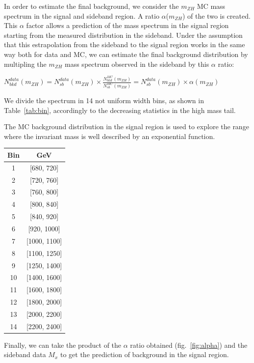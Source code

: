 \documentclass[12pt]{article} %
\begin{document}
In order to estimate the final background, we consider the $m_{ZH}$ MC mass spectrum in the signal and sideband region. A ratio $\alpha$($m_{ZH}$) of the two is created. This $\alpha$ factor allows a prediction of the mass spectrum in the signal region starting from the measured distribution in the sideband. Under the assumption that this estrapolation from the sideband to the signal region works in the same way both for data and MC, we can estimate the final background distribution by multipling the $m_{ZH}$ mass spectrum observed in the sideband by this $\alpha$ ratio:

$N_{bkd}^{data}(m_{ZH}) = N_{sb}^{data}(m_{ZH})\times \frac{N^{MC}_{bkd}(m_{ZH})}{N^{MC}_{sb}(m_{ZH})}= N_{sb}^{data}(m_{ZH})\times \alpha (m_{ZH})$


We divide the spectrum in 14 not uniform width bins, as shown in Table~\ref{tab:bin}, accordingly to the decreasing statistics in the high mass tail.

The MC background distribution in the signal region is used to explore the range where the invariant mass is well described by an exponential function.

\begin{center}
  \begin{tabular}{ c | c }
    \hline
    \bf Bin & \bf GeV \\
    \hline
    \hline
    1 & [680, 720] \\
    2 & [720, 760] \\
    3 & [760, 800] \\
    4 & [800, 840] \\
    5 & [840, 920] \\
    6 & [920, 1000] \\
    7 & [1000, 1100] \\
    8 & [1100, 1250] \\
    9 & [1250, 1400] \\
    10 & [1400, 1600] \\
    11 & [1600, 1800] \\
    12 & [1800, 2000] \\
    13 & [2000, 2200] \\
    14 & [2200, 2400] \\
    \hline
  \end{tabular}
  \label{tab:bin}
\end{center}

Finally, we can take the product of the $\alpha$ ratio obtained (fig.~\ref{fig:alpha}) and the sideband data $M_x$ to get the prediction of background in the signal region.
\end{document}
